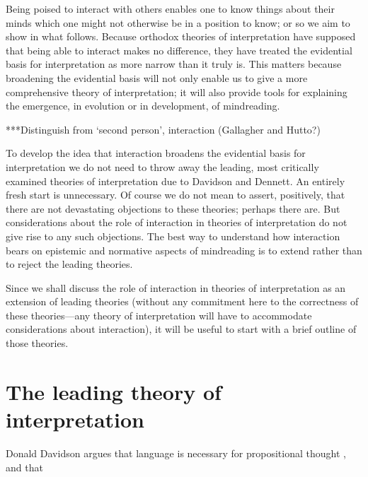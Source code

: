 \documentclass[12pt,a4paper]{extarticle}
\begin{document}
Being poised to interact with others enables one to know things about their minds which one might not otherwise be in a position to know; or so we aim to show in what follows.
Because orthodox theories of interpretation have supposed that being able to interact makes no difference,
they have treated the evidential basis for interpretation as more narrow than it truly is.
This matters because broadening the evidential basis will not only enable us to give a more comprehensive theory of interpretation; 
it will also provide tools for explaining the emergence, in evolution or in development, of mindreading.


***Distinguish from `second person', interaction (Gallagher and Hutto?)


To develop the idea that 
interaction broadens the evidential basis for interpretation
we do not need to throw away the leading, most critically examined theories of interpretation due to Davidson and Dennett.
An entirely fresh start is unnecessary.
Of course we do not mean to assert, positively, that there are not devastating objections to these theories; perhaps there are.
But considerations about the role of interaction in theories of interpretation do not give rise to any such objections.
The best way to understand how interaction bears on epistemic and normative aspects of mindreading is to extend rather than to reject the leading theories.

Since we shall discuss the role of interaction in theories of interpretation as an extension of leading theories (without any commitment here to the correctness of these theories---any theory of interpretation will have to accommodate considerations about interaction), it will be useful to start with a brief outline of those theories.



\section{The leading theory of interpretation}



Donald Davidson argues that language is necessary for propositional thought \citep[p.\ 130]{Davidson:1999mo},
and that




\end{document}
